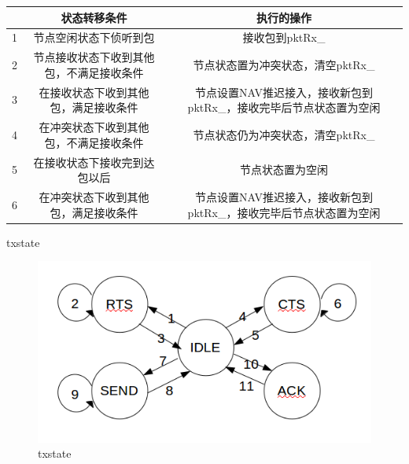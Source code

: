 \begin{table}[!ht]
	\centering
\begin{tabular}{c c c}
	\hline  %
	 &状态转移条件&执行的操作\\
	\hline  %
	1&节点空闲状态下侦听到包 & 接收包到pktRx\_\\
	2&节点接收状态下收到其他包，不满足接收条件&节点状态置为冲突状态，清空pktRx\_\\
	3&在接收状态下收到其他包，满足接收条件&节点设置NAV推迟接入，接收新包到pktRx\_，接收完毕后节点状态置为空闲\\
	4&在冲突状态下收到其他包，不满足接收条件&节点状态仍为冲突状态，清空pktRx\_\\
	5&在接收状态下接收完到达包以后&节点状态置为空闲\\	
	6&在冲突状态下收到其他包，满足接收条件&节点设置NAV推迟接入，接收新包到pktRx\_，接收完毕后节点状态置为空闲\\
	\hline
\end{tabular}
\end{table}

txstate
 \begin{figure}[!ht]
 	\centering
 	\includegraphics[scale=0.5]{figures/txstate.png}
 	\caption{
 		txstate
 	}
 	\label{fig:example}
 \end{figure}
 
